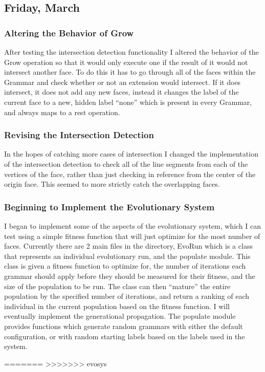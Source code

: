 \documentclass[letterpaper,oneside,titlepage]{article}
\begin{document}
\subsection{Friday, March }

\subsubsection{Altering the Behavior of Grow}
After testing the intersection detection functionality I altered the behavior of the Grow operation so that it would only execute one if the result of it would not intersect another face.  To do this it has to go through all of the faces within the Grammar and check whether or not an extension would intersect.  If it does intersect, it does not add any new faces, instead it changes the label of the current face to a new, hidden label ``none'' which is present in every Grammar, and always maps to a rest operation.

\subsubsection{Revising the Intersection Detection}
In the hopes of catching more cases of intersection I changed the implementation of the intersection detection to check all of the line segments from each of the vertices of the face, rather than just checking in reference from the center of the origin face.  This seemed to more strictly catch the overlapping faces.

\subsubsection{Beginning to Implement the Evolutionary System}
I began to implement some of the aspects of the evolutionary system, which I can test using a simple fitness function that will just optimize for the most number of faces.  Currently there are 2 main files in the directory, EvoRun which is a class that represents an individual evolutionary run, and the populate module.  This class is given a fitness function to optimize for, the number of iterations each grammar should apply before they should be measured for their fitness, and the size of the population to be run.  The class can then ``mature'' the entire population by the specified number of iterations, and return a ranking of each individual in the current population based on the fitness function.  I will eventually implement the generational propagation.  The populate module provides functions which generate random grammars with either the default configuration, or with random starting labels based on the labels used in the system.

=======
>>>>>>> evosys



\end{document}
